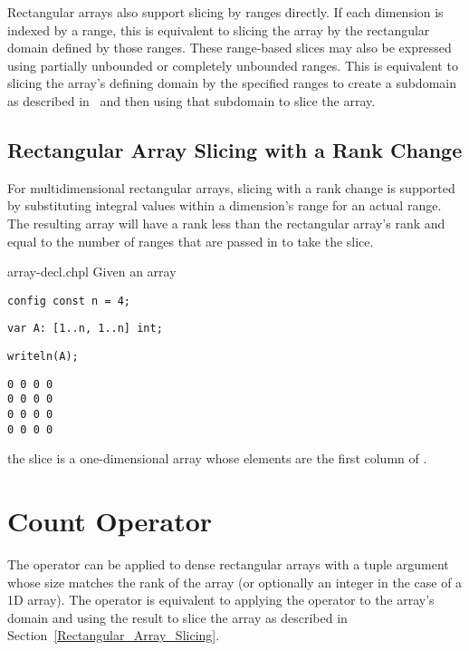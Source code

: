 Rectangular arrays also support slicing by ranges directly.  If each
dimension is indexed by a range, this is equivalent to slicing the
array by the rectangular domain defined by those ranges.  These
range-based slices may also be expressed using partially unbounded or
completely unbounded ranges.  This is equivalent to slicing the
array's defining domain by the specified ranges to create a subdomain
as described in~ and then using that subdomain to slice
the array.

\subsection{Rectangular Array Slicing with a Rank Change}
\label{Rectangular_Array_Slicing_With_Rank_Change}

For multidimensional rectangular arrays, slicing with a rank change is
supported by substituting integral values within a dimension's range
for an actual range.  The resulting array will have a rank less than
the rectangular array's rank and equal to the number of ranges that are
passed in to take the slice.

\begin{chapelexample}{array-decl.chpl}
Given an array
\begin{chapelpre}
\begin{verbatim}
config const n = 4;
\end{verbatim}
\end{chapelpre}
\begin{chapel}
\begin{verbatim}
var A: [1..n, 1..n] int;
\end{verbatim}
\end{chapel}
\begin{chapelpost}
\begin{verbatim}
writeln(A);
\end{verbatim}
\end{chapelpost}
\begin{chapeloutput}
\begin{verbatim}
0 0 0 0
0 0 0 0
0 0 0 0
0 0 0 0
\end{verbatim}
\end{chapeloutput}
the slice  is a one-dimensional array whose elements
are the first column of .
\end{chapelexample}


\section{Count Operator}
\label{Count_Operator_Arrays}
The \chpl{\#} operator can be applied to dense rectangular arrays with
a tuple argument whose size matches the rank of the array (or
optionally an integer in the case of a 1D array).  The operator is
equivalent to applying the \chpl{\#} operator to the array's domain and
using the result to slice the array as described in
Section~\ref{Rectangular_Array_Slicing}.


